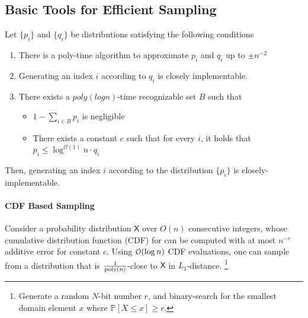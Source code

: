 \subsection{Basic Tools for Efficient Sampling}
\label{sec:basic_tools_for_efficient_sampling}
\begin{lemma}
\label{lem:rejection_sampling}
Let $\{p_i\}$ and $\{q_i\}$ be distributions satisfying the following conditions
\begin{enumerate}
    \item There is a poly-time algorithm to approximate $p_i$ and $q_i$ up to $\pm n^{-2}$
    \item Generating an index $i$ according to $q_i$ is closely implementable.
    \item There exists a $poly(log n)$-time recognizable set $B$ such that
    \begin{itemize}
        \item $1-\sum\limits_{i\in B} p_i$ is negligible
        \item There exists a constant $c$ such that for every $i$, it holds that $p_i\le \log^{\mathcal{O}(1)} n\cdot q_i$
    \end{itemize}
\end{enumerate}
Then, generating an index $i$ according to the distribution $\{p_i\}$ is closely-implementable.
\end{lemma}

\paragraph*{CDF Based Sampling}
\label{par:cdf_based_sampling}

Consider a probability distribution $\mathsf{X}$ over $O(n)$ consecutive integers,
whose cumulative distribution function (CDF) for can be computed with at most $n^{-c}$ additive error for constant $c$.
Using $\Bo(\log n)$ CDF evaluations, one can sample from a distribution that is $\frac{1}{\mathrm{poly}(n)}$-close to $\mathsf{X}$ in $L_1$-distance.
\footnote{Generate a random $N$-bit number $r$, and binary-search for the smallest domain element $x$ where $\mathbb P[X\leq x] \geq r$.}
